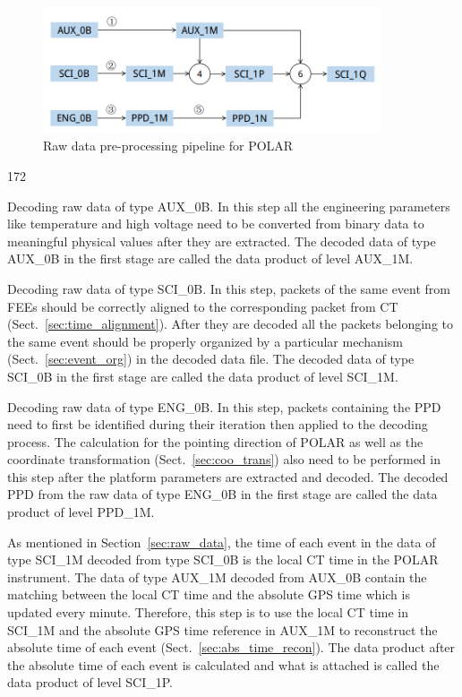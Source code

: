 \documentclass{raa}
\begin{document}
\begin{figure}[!ht]
\centering
\includegraphics[width=10cm]{images/preprocessing_pipeline.png}
\caption{Raw data pre-processing pipeline for POLAR}\label{fig:preprocessing_pipeline}
\end{figure}
\begin{dingautolist}{172}
\item Decoding raw data of type AUX\_0B. In this step all the engineering parameters like temperature and high voltage need to be converted from binary data to meaningful physical values after they are extracted. The decoded data of type AUX\_0B in the first stage are called the data product of level AUX\_1M.
\item Decoding raw data of type SCI\_0B. In this step, packets of the same event from FEEs should be correctly aligned to the corresponding packet from CT (Sect.~\ref{sec:time_alignment}). After they are decoded all the packets belonging to the same event should be properly organized by a particular mechanism (Sect.~\ref{sec:event_org}) in the decoded data file. The decoded data of type SCI\_0B in the first stage are called the data product of level SCI\_1M.
\item Decoding raw data of type ENG\_0B. In this step, packets containing the PPD need to first be identified during their iteration then applied to the decoding process. The calculation for the pointing direction of POLAR as well as the coordinate transformation (Sect.~\ref{sec:coo_trans}) also need to be performed in this step after the platform parameters are extracted and decoded. The decoded PPD from the raw data of type ENG\_0B in the first stage are called the data product of level PPD\_1M.
\item As mentioned in Section~\ref{sec:raw_data}, the time of each event in the data of type SCI\_1M decoded from type SCI\_0B is the local CT time in the POLAR instrument. The data of type AUX\_1M decoded from AUX\_0B contain the matching between the local CT time and the absolute GPS time which is updated every minute. Therefore, this step is to use the local CT time in SCI\_1M and the absolute GPS time reference in AUX\_1M to reconstruct the absolute time of each event (Sect.~\ref{sec:abs_time_recon}). The data product after the absolute time of each event is calculated and what is attached is called the data product of level SCI\_1P.

\end{dingautolist}
\end{document}
